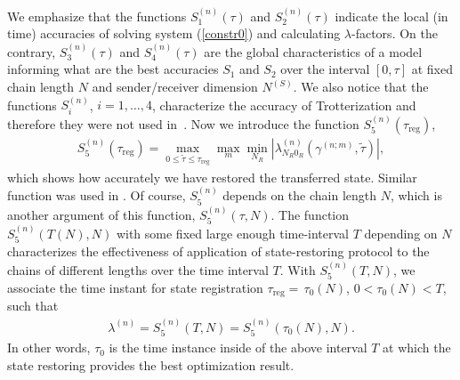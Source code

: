 \documentclass[pra,preprint,showpacs]{revtex4-1}
\begin{document}
{{ We emphasize that the functions $S^{(n)}_1(\tau)$ and $S^{(n)}_2(\tau)$ indicate the local (in time) accuracies of solving system (\ref{constr0}) and calculating $\lambda$-factors.
On the contrary, $S^{(n)}_3(\tau)$ and $S^{(n)}_4(\tau)$ are the
global characteristics of  a model informing  what are the best accuracies  $S_1$ and $S_2$ over the interval $[0,\tau]$ at fixed chain length $N$ and sender/receiver dimension $N^{(S)}$.}
{We also} notice that the functions $S^{(n)}_i$, $i=1,\dots,4$, characterize the accuracy of Trotterization  and therefore they were not used in~\cite{BFLP_2022}. Now we introduce the function
$S^{(n)}_5(\tau_{\mathrm{reg}})$,
\begin{eqnarray}\label{S5}
S^{(n)}_5(\tau_{\mathrm{reg}}) = \max_{0\le\tilde \tau\le \tau_{\mathrm{reg}}} \max_{m} \min_{N_R} \left|\lambda ^{(n)}_{N_R0_R} (\gamma^{(n;m)},\tilde \tau)\right|,
\end{eqnarray}
which shows how accurately we have restored the transferred state. Similar function was used in \cite{BFLP_2022}. Of course, $S^{(n)}_5$ depends on the chain length $N$, which is another argument of this  function, $S^{(n)}_5(\tau,N)$. The function $S^{(n)}_5(T(N),N)$ with some fixed large enough time-interval $T$ depending on $N$ characterizes the effectiveness of application of state-restoring protocol to the chains of different lengths over the  time interval $T$.  With $S^{(n)}_5(T,N)$, we associate the time instant { for  state registration}  ${\tau_{\mathrm{reg}} =} \,\tau_0(N)$,
$0<\tau_0(N)< T $, such that
\begin{eqnarray}\label{lamn2}
\lambda^{(n)}=S^{(n)}_5(T,N) = S^{(n)}_5(\tau_0(N) ,N).
\end{eqnarray}
In other words, $\tau_0$ is the time instance inside of the above interval $T$ at which the state restoring provides the best optimization result.

}
\end{document}
